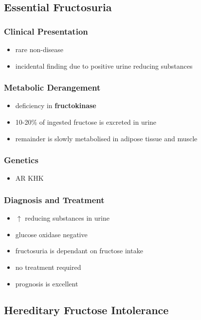 \documentclass{scrartcl}
\begin{document}
\subsection{Essential Fructosuria}
\label{sec:org6c6da00}
\subsubsection{Clinical Presentation}
\label{sec:org9f0a0ee}
\begin{itemize}
\item rare non-disease
\item incidental finding due to positive urine reducing substances
\end{itemize}
\subsubsection{Metabolic Derangement}
\label{sec:orge45cb0e}
\begin{itemize}
\item deficiency in \textbf{fructokinase}
\item 10-20\% of ingested fructose is excreted in urine
\item remainder is slowly metabolised in adipose tissue and muscle
\end{itemize}
\subsubsection{Genetics}
\label{sec:org60086df}
\begin{itemize}
\item AR KHK
\end{itemize}
\subsubsection{Diagnosis and Treatment}
\label{sec:org216d23f}
\begin{itemize}
\item \(\uparrow\) reducing substances in urine
\item glucose oxidase negative
\item fructosuria is dependant on fructose intake
\item no treatment required
\item prognosis is excellent
\end{itemize}

\subsection{Hereditary Fructose Intolerance}
\label{sec:org2fee0a7}
\end{document}
